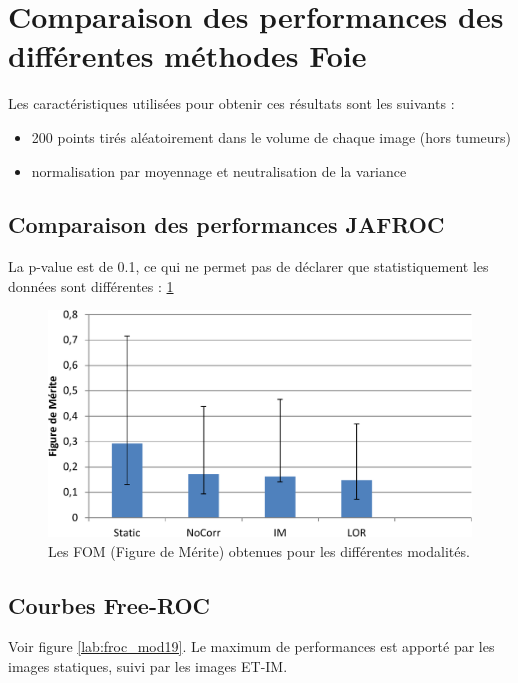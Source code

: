 \FloatBarrier

\section{Comparaison des performances des différentes méthodes Foie}

Les caractéristiques utilisées pour obtenir ces résultats sont les suivants :

\begin{itemize}
 \item 200 points tirés aléatoirement dans le volume de chaque image (hors tumeurs)
 \item normalisation par moyennage et neutralisation de la variance 
\end{itemize}

\subsection{Comparaison des performances JAFROC}

La p-value est de 0.1, ce qui ne permet pas de déclarer que statistiquement les données sont différentes : \ref{lab:fom_mod19}


\begin{figure}[h!]
 \begin{center}
   \includegraphics[width=15cm]{images/FOM_mod19}
 \end{center}
 \caption{ \label{lab:fom_mod19} Les FOM (Figure de Mérite) obtenues pour les différentes modalités.}
\end{figure}


\subsection{Courbes Free-ROC}

Voir figure \ref{lab:froc_mod19}.
Le maximum de performances est apporté par les images statiques, suivi par les images ET-IM.

